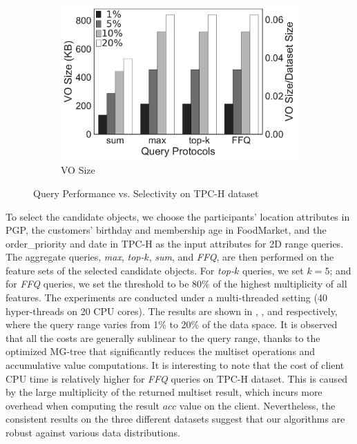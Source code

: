 \begin{figure}[t]
\begin{subfigure}[b]{.36\linewidth}
    \includegraphics[width=\linewidth]{exp-figs/aggregate-queries/tpch_vo.pdf}
    \caption{VO Size}
  \end{subfigure}
  \caption{Query Performance vs. Selectivity on TPC-H dataset}\label{fig:aggregate-queries:tpch}
\end{figure}

To select the candidate objects, we choose the participants' location attributes in PGP, the customers' birthday and membership age in FoodMarket, and the order\_priority and date in TPC-H as the input attributes for 2D range queries. The aggregate queries, \emph{max}, \emph{top-$k$}, \emph{sum}, and \emph{FFQ}, are then performed on the feature sets of the selected candidate objects. For  \emph{top-$k$} queries, we set $k=5$; and for \emph{FFQ} queries, we set the threshold to be 80\% of the highest multiplicity of all features. The experiments are conducted under a multi-threaded setting (40 hyper-threads on 20 CPU cores). The results are shown in , , and  respectively, where the query range varies from 1\% to 20\% of the data space. It is observed that all the costs are generally sublinear to the query range, thanks to the optimized MG-tree that significantly reduces the multiset operations and accumulative value computations.
It is interesting to note that  the cost of client CPU time is relatively higher for \emph{FFQ} queries on TPC-H dataset. This is caused by the large multiplicity of the returned multiset result, which incurs more overhead when computing the result $acc$ value on the client.
Nevertheless, the consistent results on the three different datasets suggest that our algorithms are robust against various data distributions.

